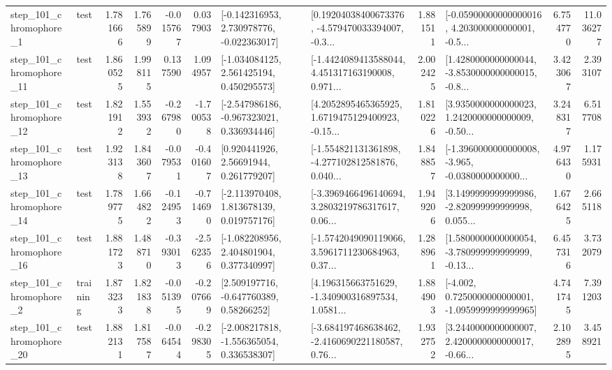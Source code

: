 \begin{tabular}{llrrrrllrlrr}
   step\_101\_chromophore\_1 &      test &      1.781666 &    1.765899 &     -0.015767 &  0.037903 &   [-0.142316953, 2.730978776, -0.022363017] &  [0.19204038400673376, -4.579470033394007, -0.3... &       1.881511 &  [-0.05900000000000016, 4.203000000000001, -0.5... &            6.754770 &         11.036277 \\
  step\_101\_chromophore\_11 &      test &      1.860525 &    1.998115 &      0.137590 &  1.094957 &    [-1.034084125, 2.561425194, 0.450295573] &  [-1.4424089413588044, 4.451317163190008, 0.971... &       2.002425 &  [1.4280000000000044, -3.8530000000000015, -0.8... &            3.423067 &          2.393107 \\
  step\_101\_chromophore\_12 &      test &      1.821912 &    1.553932 &     -0.267980 & -1.700538 &   [-2.547986186, -0.967323021, 0.336934446] &  [4.2052895465365925, 1.6719475129400923, -0.15... &       1.810226 &  [3.9350000000000023, 1.2420000000000009, -0.50... &            3.248317 &          6.517708 \\
  step\_101\_chromophore\_13 &      test &      1.923138 &    1.843607 &     -0.079531 & -0.401607 &      [0.920441926, 2.56691944, 0.261779207] &  [-1.554821131361898, -4.277102812581876, 0.040... &       1.848857 &  [-1.3960000000000008, -3.965, -0.0380000000000... &            4.976430 &          1.175931 \\
  step\_101\_chromophore\_14 &      test &      1.789775 &    1.664822 &     -0.124953 & -0.714690 &    [-2.113970408, 1.813678139, 0.019757176] &  [-3.3969466496140694, 3.2803219786317617, 0.06... &       1.949206 &  [3.1499999999999986, -2.820999999999998, 0.055... &            1.676425 &          2.665118 \\
  step\_101\_chromophore\_16 &      test &      1.881723 &    1.488710 &     -0.393013 & -2.562356 &    [-1.082208956, 2.404801904, 0.377340997] &  [-1.5742049090119066, 3.5961711230684963, 0.37... &       1.288961 &  [1.5800000000000054, -3.780999999999999, -0.13... &            6.457316 &          3.732079 \\
   step\_101\_chromophore\_2 &  training &      1.873233 &    1.821838 &     -0.051395 & -0.207669 &     [2.509197716, -0.647760389, 0.58266252] &  [4.196315663751629, -1.340900316897534, 1.0581... &       1.884903 &  [-4.002, 0.7250000000000001, -1.0959999999999965] &            4.741745 &          7.391203 \\
  step\_101\_chromophore\_20 &      test &      1.882131 &    1.817587 &     -0.064544 & -0.298305 &   [-2.008217818, -1.556365054, 0.336538307] &  [-3.684197468638462, -2.4160690221180587, 0.76... &       1.932752 &  [3.2440000000000007, 2.4200000000000017, -0.66... &            2.102895 &          3.458921 \\

\end{tabular}
